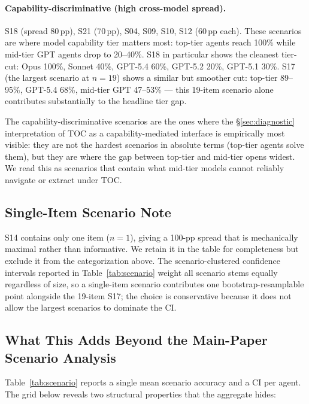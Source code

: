\documentclass{article}
\begin{document}
\paragraph{Capability-discriminative (high cross-model spread).}
S18 (spread 80\,pp), S21 (70\,pp), S04, S09, S10, S12 (60\,pp each). These scenarios are where model capability tier matters most: top-tier agents reach 100\% while mid-tier GPT agents drop to 20--40\%. S18 in particular shows the cleanest tier-cut: Opus 100\%, Sonnet 40\%, GPT-5.4 60\%, GPT-5.2 20\%, GPT-5.1 30\%. S17 (the largest scenario at $n=19$) shows a similar but smoother cut: top-tier 89--95\%, GPT-5.4 68\%, mid-tier GPT 47--53\% --- this 19-item scenario alone contributes substantially to the headline tier gap.

The capability-discriminative scenarios are the ones where the §\ref{sec:diagnostic} interpretation of TOC as a capability-mediated interface is empirically most visible: they are not the hardest scenarios in absolute terms (top-tier agents solve them), but they are where the gap between top-tier and mid-tier opens widest. We read this as scenarios that contain what mid-tier models cannot reliably navigate or extract under TOC.

\subsection{Single-Item Scenario Note}

S14 contains only one item ($n=1$), giving a 100-pp spread that is mechanically maximal rather than informative. We retain it in the table for completeness but exclude it from the categorization above. The scenario-clustered confidence intervals reported in Table~\ref{tab:scenario} weight all scenario stems equally regardless of size, so a single-item scenario contributes one bootstrap-resamplable point alongside the 19-item S17; the choice is conservative because it does not allow the largest scenarios to dominate the CI.

\subsection{What This Adds Beyond the Main-Paper Scenario Analysis}

Table~\ref{tab:scenario} reports a single mean scenario accuracy and a CI per agent. The grid below reveals two structural properties that the aggregate hides:
\end{document}
